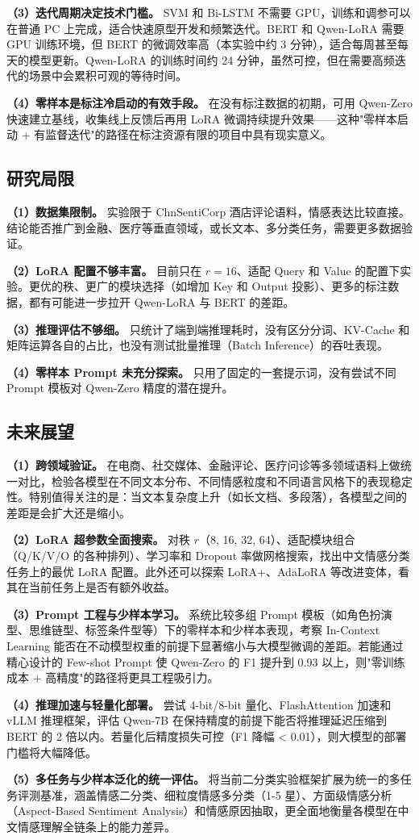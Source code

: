 \textbf{（3）迭代周期决定技术门槛。} SVM 和 Bi-LSTM 不需要 GPU，训练和调参可以在普通 PC 上完成，适合快速原型开发和频繁迭代。BERT 和 Qwen-LoRA 需要 GPU 训练环境，但 BERT 的微调效率高（本实验中约 3 分钟），适合每周甚至每天的模型更新。Qwen-LoRA 的训练时间约 24 分钟，虽然可控，但在需要高频迭代的场景中会累积可观的等待时间。

\textbf{（4）零样本是标注冷启动的有效手段。} 在没有标注数据的初期，可用 Qwen-Zero 快速建立基线，收集线上反馈后再用 LoRA 微调持续提升效果——这种"零样本启动 + 有监督迭代"的路径在标注资源有限的项目中具有现实意义。

\subsection{研究局限}

\textbf{（1）数据集限制。} 实验限于 ChnSentiCorp 酒店评论语料，情感表达比较直接。结论能否推广到金融、医疗等垂直领域，或长文本、多分类任务，需要更多数据验证。

\textbf{（2）LoRA 配置不够丰富。} 目前只在 $r=16$、适配 Query 和 Value 的配置下实验。更优的秩、更广的模块选择（如增加 Key 和 Output 投影）、更多的标注数据，都有可能进一步拉开 Qwen-LoRA 与 BERT 的差距。

\textbf{（3）推理评估不够细。} 只统计了端到端推理耗时，没有区分分词、KV-Cache 和矩阵运算各自的占比，也没有测试批量推理（Batch Inference）的吞吐表现。

\textbf{（4）零样本 Prompt 未充分探索。} 只用了固定的一套提示词，没有尝试不同 Prompt 模板对 Qwen-Zero 精度的潜在提升。

\subsection{未来展望}

\textbf{（1）跨领域验证。} 在电商、社交媒体、金融评论、医疗问诊等多领域语料上做统一对比，检验各模型在不同文本分布、不同情感粒度和不同语言风格下的表现稳定性。特别值得关注的是：当文本复杂度上升（如长文档、多段落），各模型之间的差距是会扩大还是缩小。

\textbf{（2）LoRA 超参数全面搜索。} 对秩 $r$（8, 16, 32, 64）、适配模块组合（Q/K/V/O 的各种排列）、学习率和 Dropout 率做网格搜索，找出中文情感分类任务上的最优 LoRA 配置。此外还可以探索 LoRA+、AdaLoRA 等改进变体，看其在当前任务上是否有额外收益。

\textbf{（3）Prompt 工程与少样本学习。} 系统比较多组 Prompt 模板（如角色扮演型、思维链型、标签条件型等）下的零样本和少样本表现，考察 In-Context Learning 能否在不动模型权重的前提下显著缩小与大模型微调的差距。若能通过精心设计的 Few-shot Prompt 使 Qwen-Zero 的 F1 提升到 0.93 以上，则"零训练成本 + 高精度"的路径将更具工程吸引力。

\textbf{（4）推理加速与轻量化部署。} 尝试 4-bit/8-bit 量化、FlashAttention 加速和 vLLM 推理框架，评估 Qwen-7B 在保持精度的前提下能否将推理延迟压缩到 BERT 的 2 倍以内。若量化后精度损失可控（F1 降幅 < 0.01），则大模型的部署门槛将大幅降低。

\textbf{（5）多任务与少样本泛化的统一评估。} 将当前二分类实验框架扩展为统一的多任务评测基准，涵盖情感二分类、细粒度情感多分类（1-5 星）、方面级情感分析（Aspect-Based Sentiment Analysis）和情感原因抽取，更全面地衡量各模型在中文情感理解全链条上的能力差异。
